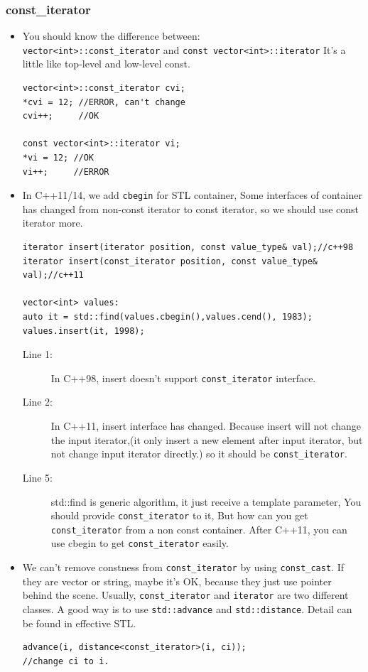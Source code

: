 \documentclass[a4paper,11pt,twoside]{book}
\begin{document}
\subsubsection{const\_iterator}
\begin{itemize}
	\item You should know the difference between: \\
	\texttt{vector<int>::const\_iterator} and \texttt{const vector<int>::iterator}
	It's a little like top-level and low-level const. 
\begin{lstlisting}[numbers=none]
vector<int>::const_iterator cvi;
*cvi = 12; //ERROR, can't change
cvi++;     //OK

const vector<int>::iterator vi;
*vi = 12; //OK
vi++;     //ERROR
\end{lstlisting}
	
	\item In C++11/14, we add \texttt{cbegin} for STL container, Some interfaces of container has changed from non-const iterator to const iterator, so we should use const iterator more. 
\begin{lstlisting}
iterator insert(iterator position, const value_type& val);//c++98
iterator insert(const_iterator position, const value_type& val);//c++11

vector<int> values:
auto it = std::find(values.cbegin(),values.cend(), 1983);
values.insert(it, 1998);
\end{lstlisting}
	\begin{description}
		\item[Line 1:] In C++98, insert doesn't support \texttt{const\_iterator} interface.
		
		\item[Line 2:] In C++11, insert interface has changed. Because insert will not change the input iterator,(it only insert a new element after input iterator, but not change input iterator directly.) so it should be \texttt{const\_iterator}.
		
		\item[Line 5:] std::find is generic algorithm, it just receive a template parameter,  You should provide \texttt{const\_iterator} to it, But how can you get \texttt{const\_iterator} from a non const container. After C++11, you can use cbegin to get \texttt{const\_iterator} easily.
	\end{description}
	
	\item We can't remove constness from \texttt{const\_iterator} by using \texttt{const\_cast}. If they are vector or string, maybe it's OK, because they just use pointer behind the scene. Usually, \texttt{const\_iterator} and \texttt{iterator} are two different classes. A good way is to use \texttt{std::advance} and \texttt{std::distance}. Detail can be found in effective STL. 
\begin{lstlisting}[]
advance(i, distance<const_iterator>(i, ci));
//change ci to i. 
\end{lstlisting}


\end{itemize}
\end{document}
